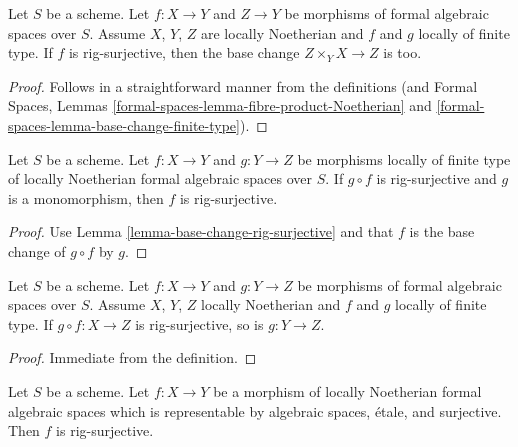 \begin{lemma}
\label{lemma-base-change-rig-surjective}
Let $S$ be a scheme. Let $f : X \to Y$ and $Z \to Y$ be morphisms
of formal algebraic spaces over $S$. Assume $X$, $Y$, $Z$ are locally
Noetherian and $f$ and $g$ locally of finite type. If $f$ is
rig-surjective, then the base change $Z \times_Y X \to Z$ is too.
\end{lemma}

\begin{proof}
Follows in a straightforward manner from the definitions (and
Formal Spaces, Lemmas \ref{formal-spaces-lemma-fibre-product-Noetherian} and
\ref{formal-spaces-lemma-base-change-finite-type}).
\end{proof}

\begin{lemma}
\label{lemma-rig-surjective-alternative-permanence}
Let $S$ be a scheme. Let $f : X \to Y$ and $g : Y \to Z$
be morphisms locally of finite type of locally Noetherian
formal algebraic spaces over $S$. If $g \circ f$ is rig-surjective
and $g$ is a monomorphism, then $f$ is rig-surjective.
\end{lemma}

\begin{proof}
Use Lemma \ref{lemma-base-change-rig-surjective} and that
$f$ is the base change of $g \circ f$ by $g$.
\end{proof}

\begin{lemma}
\label{lemma-permanence-rig-surjective}
Let $S$ be a scheme. Let $f : X \to Y$ and $g : Y \to Z$ be morphisms of
formal algebraic spaces over $S$. Assume $X$, $Y$, $Z$ locally Noetherian
and $f$ and $g$ locally of finite type. If $g \circ f : X \to Z$
is rig-surjective, so is $g : Y \to Z$.
\end{lemma}

\begin{proof}
Immediate from the definition.
\end{proof}

\begin{lemma}
\label{lemma-etale-covering-rig-surjective}
Let $S$ be a scheme. Let $f : X \to Y$ be a morphism of locally Noetherian
formal algebraic spaces which is representable by algebraic spaces, \'etale,
and surjective. Then $f$ is rig-surjective.
\end{lemma}

